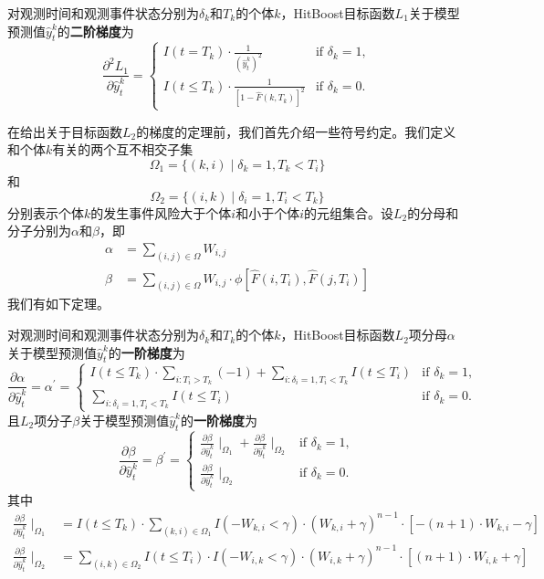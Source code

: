 \begin{theorem}\label{thm:1.2}
对观测时间和观测事件状态分别为$\delta_k$和$T_k$的个体$k$，HitBoost目标函数$L_1$关于模型预测值$\hat{y}_t^k$的\textbf{二阶梯度}为$$
\frac{\partial^2 L_1}{\partial \hat{y}_t^k}=
\begin{cases}
I(t=T_k)\cdot \frac{1}{{(\hat{y}_t^k)}^2} & \text{if } \delta_k = 1,\\
I(t\le T_k)\cdot \frac{1}{{[1-\hat{F}(k, T_k)]}^2} & \text{if } \delta_k = 0.
\end{cases}
$$
\end{theorem}

在给出关于目标函数$L_2$的梯度的定理前，我们首先介绍一些符号约定。我们定义和个体$k$有关的两个互不相交子集$$
\Omega_1=\{(k,i) \mid \delta_k=1,T_k < T_i\}
$$
和$$
\Omega_2=\{(i,k) \mid \delta_i=1,T_i < T_k\}
$$
分别表示个体$k$的发生事件风险大于个体$i$和小于个体$i$的元组集合。设$L_2$的分母和分子分别为$\alpha$和$\beta$，即\[
\begin{split}
\alpha &= \sum_{(i,j)\in \Omega} W_{i,j}\\
\beta &= \sum_{(i,j)\in \Omega} W_{i,j} \cdot \phi\left[ \hat{F}(i, T_i), \hat{F}(j, T_i) \right]
\end{split}
\]
我们有如下定理。

\begin{theorem}\label{thm:1.3}
对观测时间和观测事件状态分别为$\delta_k$和$T_k$的个体$k$，HitBoost目标函数$L_2$项分母$\alpha$关于模型预测值$\hat{y}_t^k$的\textbf{一阶梯度}为$$
\frac{\partial \alpha}{\partial \hat{y}_t^k}=\alpha^{'}=
\begin{cases}
I(t\le T_k)\cdot {\sum\limits_{i: T_i>T_k}(-1)} + \sum\limits_{i: \delta_i=1,T_i<T_k} I(t\le T_i) & \text{if } \delta_k = 1,\\
\sum\limits_{i: \delta_i=1,T_i<T_k} I(t\le T_i) & \text{if } \delta_k = 0.
\end{cases}
$$ 且$L_2$项分子$\beta$关于模型预测值$\hat{y}_t^k$的\textbf{一阶梯度}为$$
\frac{\partial \beta}{\partial \hat{y}_t^k}=\beta^{'}=
\begin{cases}
\frac{\partial \beta}{\partial \hat{y}_t^k} \mid_{\Omega_1} + \frac{\partial \beta}{\partial \hat{y}_t^k} \mid_{\Omega_2} & \text{if } \delta_k = 1,\\
\frac{\partial \beta}{\partial \hat{y}_t^k} \mid_{\Omega_2} & \text{if } \delta_k = 0.
\end{cases}
$$ 其中\[
\begin{split}
\frac{\partial \beta}{\partial \hat{y}_t^k} \mid_{\Omega_1} &= I(t\le T_k)\cdot \sum\limits_{(k,i)\in \Omega_1} {I(-W_{k,i}<\gamma)\cdot (W_{k,i}+\gamma)^{n-1}\cdot [-(n+1)\cdot W_{k,i}-\gamma]} \\
\frac{\partial \beta}{\partial \hat{y}_t^k} \mid_{\Omega_2} &= \sum\limits_{(i,k)\in \Omega_2} {I(t\le T_i)\cdot I(-W_{i,k}<\gamma)\cdot (W_{i,k}+\gamma)^{n-1}\cdot [(n+1)\cdot W_{i,k}+\gamma]}
\end{split}
\]
\end{theorem}

